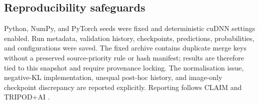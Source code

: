 \subsection{Reproducibility safeguards}\label{sec:reproducibility}
Python, NumPy, and PyTorch seeds were fixed and deterministic cuDNN settings
enabled. Run metadata, validation history, checkpoints, predictions,
probabilities, and configurations were saved. The fixed archive contains
duplicate merge keys without a preserved source-priority rule or hash manifest;
results are therefore tied to this snapshot and require provenance locking.
The normalisation issue, negative-KL implementation, unequal post-hoc history,
and image-only checkpoint discrepancy are reported explicitly. Reporting follows
CLAIM and TRIPOD+AI \citep{mongan2024claim,collins2024tripodai}.
